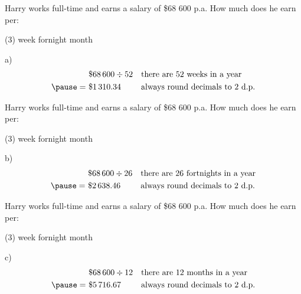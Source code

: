 \documentclass[aspectratio=1610,10pt]{beamer}
\begin{document}
\begin{frame}
  \begin{example}
    Harry works full-time and earns a salary of \$68 600 p.a. How much does he earn per:
    \begin{tasks}(3)
      \task week
      \task fornight
      \task month
    \end{tasks}
  \end{example}\pause
  \begin{solution}
    a) \[\begin{aligned}
      &\  \$68\,600\div 52 && \text{there are 52 weeks in a year}\\\pause
      =&\ \$1\,310.34 && \text{always round decimals to 2 d.p.}
    \end{aligned}\]
  \end{solution}
\end{frame}
\addtocounter{example}{-1}
\begin{frame}
  \begin{example}
    Harry works full-time and earns a salary of \$68 600 p.a. How much does he earn per:
    \begin{tasks}(3)
      \task week
      \task fornight
      \task month
    \end{tasks}
  \end{example}
  \begin{solution}
    b) \[\begin{aligned}
      &\  \$68\,600\div 26 && \text{there are 26 fortnights in a year}\\\pause
      =&\ \$2\,638.46 && \text{always round decimals to 2 d.p.}
    \end{aligned}\]
  \end{solution}
\end{frame}
\addtocounter{example}{-1}
\begin{frame}
  \begin{example}
    Harry works full-time and earns a salary of \$68 600 p.a. How much does he earn per:
    \begin{tasks}(3)
      \task week
      \task fornight
      \task month
    \end{tasks}
  \end{example}
  \begin{solution}
    c) \[\begin{aligned}
      &\  \$68\,600\div 12 && \text{there are 12 months in a year}\\\pause
      =&\ \$5\,716.67 && \text{always round decimals to 2 d.p.}
    \end{aligned}\]
  \end{solution}
\end{frame}
\end{document}
